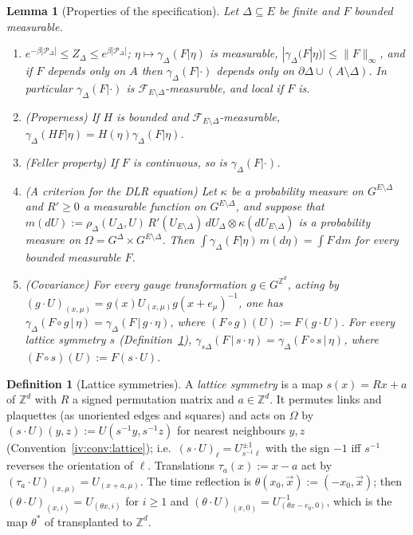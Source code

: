 \documentclass[11pt,a4paper]{article}
\newtheorem{lemma}[theorem]{Lemma}
\theoremstyle{definition}
\newtheorem{definition}[theorem]{Definition}
\theoremstyle{remark}
\newcommand{\Z}{\mathbb{Z}}
\newcommand{\cF}{\mathcal{F}}
\newcommand{\cP}{\mathcal{P}}
\newcommand{\norm}[1]{\lVert #1\rVert}
\newcommand{\Fname}[2]{\cite[#1~`#2']{F}}
\begin{document}
\begin{lemma}[Properties of the specification]\label{iv:lem:spec}
Let $\Delta\subseteq E$ be finite and $F$ bounded measurable.
\begin{enumerate}[label=(\alph*)]
\item $e^{-\beta|\cP_\Delta|}\le Z_\Delta\le e^{\beta|\cP_\Delta|}$; $\eta\mapsto\gamma_\Delta(F|\eta)$ is measurable,
$|\gamma_\Delta(F|\eta)|\le\norm F_\infty$, and if $F$ depends only on $A$ then $\gamma_\Delta(F|\cdot)$ depends only on
$\partial\Delta\cup(A\setminus\Delta)$. In particular $\gamma_\Delta(F|\cdot)$ is $\cF_{E\setminus\Delta}$-measurable, and
local if $F$ is.
\item \emph{(Properness)} If $H$ is bounded and $\cF_{E\setminus\Delta}$-measurable, $\gamma_\Delta(HF|\eta)=H(\eta)\gamma_\Delta(F|\eta)$.
\item \emph{(Feller property)} If $F$ is continuous, so is $\gamma_\Delta(F|\cdot)$.
\item \emph{(A criterion for the DLR equation)} Let $\kappa$ be a probability measure on $G^{E\setminus\Delta}$ and $R'\ge0$
a measurable function on $G^{E\setminus\Delta}$, and suppose that $m(dU):=\rho_\Delta(U_\Delta,U)\,R'(U_{E\setminus\Delta})
\,dU_\Delta\otimes\kappa(dU_{E\setminus\Delta})$ is a probability measure on $\Omega=G^\Delta\times G^{E\setminus\Delta}$.
Then $\int\gamma_\Delta(F|\eta)\,m(d\eta)=\int F\,dm$ for every bounded measurable $F$.
\item \emph{(Covariance)} For every gauge transformation $g\in G^{\Z^d}$, acting by
$(g\cdot U)_{(x,\mu)}=g(x)U_{(x,\mu)}g(x+e_\mu)^{-1}$, one has $\gamma_\Delta(F\circ g\,|\,\eta)=\gamma_\Delta(F\,|\,g\cdot\eta)$,
where $(F\circ g)(U):=F(g\cdot U)$. For every lattice symmetry $s$ (Definition~\ref{iv:def:symm}),
$\gamma_{s\Delta}(F\,|\,s\cdot\eta)=\gamma_\Delta(F\circ s\,|\,\eta)$, where $(F\circ s)(U):=F(s\cdot U)$.
\end{enumerate}
\end{lemma}

\begin{definition}[Lattice symmetries]\label{iv:def:symm}
A \emph{lattice symmetry} is a map $s(x)=Rx+a$ of $\Z^d$ with $R$ a signed permutation matrix and $a\in\Z^d$. It permutes
links and plaquettes (as unoriented edges and squares) and acts on $\Omega$ by $(s\cdot U)(y,z):=U(s^{-1}y,s^{-1}z)$ for
nearest neighbours $y,z$ (Convention~\ref{iv:conv:lattice}); i.e.\ $(s\cdot U)_\ell=U_{s^{-1}\ell}^{\pm1}$ with the sign
$-1$ iff $s^{-1}$ reverses the orientation of $\ell$. Translations $\tau_a(x):=x-a$ act by $(\tau_a\cdot U)_{(x,\mu)}=U_{(x+a,\mu)}$.
The time reflection is $\theta(x_0,\vec x):=(-x_0,\vec x)$; then $(\theta\cdot U)_{(x,i)}=U_{(\theta x,i)}$ for $i\ge1$ and
$(\theta\cdot U)_{(x,0)}=U_{(\theta x-e_0,0)}^{-1}$, which is the map $\theta^*$ of \Fname{Section}{Reflection positivity}
transplanted to $\Z^d$.
\end{definition}
\end{document}

